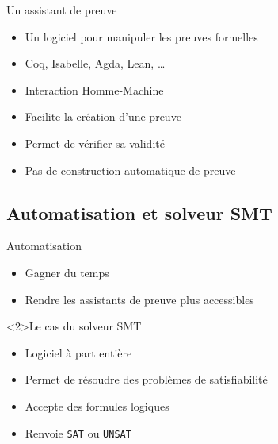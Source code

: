 \documentclass[french,usepdftitle=false,compress]{beamer}
\begin{document}
\begin{frame}{Un assistant de preuve}
  \begin{block}{}
    \begin{itemize}
      \item Un logiciel pour manipuler les preuves formelles
      \item Coq, Isabelle, Agda, Lean, \dots
      \item Interaction Homme-Machine
    \end{itemize}
  \end{block}

  \begin{exampleblock}{}
    \begin{itemize}
      \item Facilite la création d'une preuve
      \item Permet de vérifier sa validité
    \end{itemize}
  \end{exampleblock}

  \begin{alertblock}{}
    \begin{itemize}
      \item Pas de construction automatique de preuve
    \end{itemize}
  \end{alertblock}
\end{frame}

\subsection{Automatisation et solveur SMT}
\begin{frame}{Automatisation}
  \begin{exampleblock}{}
    \begin{itemize}
      \item Gagner du temps
      \item Rendre les assistants de preuve plus accessibles
    \end{itemize}
  \end{exampleblock}

  \begin{block}<2>{Le cas du solveur SMT}
    \begin{itemize}
      \item Logiciel à part entière
      \item Permet de résoudre des problèmes de satisfiabilité
      \item Accepte des formules logiques
      \item Renvoie \texttt{SAT} ou \texttt{UNSAT}
    \end{itemize}
  \end{block}
\end{frame}
\end{document}
